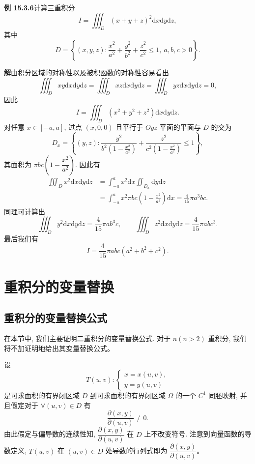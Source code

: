 \documentclass[UTF8,12pt,a4paper,fontset=fandol]{ctexart}
\begin{document}
\noindent\textbf{例 15.3.6}\quad 计算三重积分
\[
  I=\iiint_D (x+y+z)^2\mathrm dx\mathrm dy\mathrm dz,
\]
其中
\[
  D=\left\{(x,y,z):\frac{x^2}{a^2}+\frac{y^2}{b^2}+\frac{z^2}{c^2}\leqslant1,\ a,b,c>0\right\}.
\]

\noindent\textbf{解}\quad 由积分区域的对称性以及被积函数的对称性容易看出
\[
  \iiint_D xy\mathrm dx\mathrm dy\mathrm dz
  =\iiint_D xz\mathrm dx\mathrm dy\mathrm dz
  =\iiint_D yz\mathrm dx\mathrm dy\mathrm dz=0,
\]
因此
\[
  I=\iiint_D (x^2+y^2+z^2)\mathrm dx\mathrm dy\mathrm dz.
\]
对任意 $x\in[-a,a]$, 过点 $(x,0,0)$ 且平行于 $Oyz$ 平面的平面与 $D$ 的交为
\[
  D_x=\left\{(y,z):\frac{y^2}{b^2\left(1-\frac{x^2}{a^2}\right)}
  +\frac{z^2}{c^2\left(1-\frac{x^2}{a^2}\right)}\leqslant1\right\},
\]
其面积为 $\pi bc\left(1-\dfrac{x^2}{a^2}\right)$. 因此有
\[
\begin{aligned}
  \iiint_D x^2\mathrm dx\mathrm dy\mathrm dz
  &=\int_{-a}^a x^2\mathrm dx\iint_{D_x}\mathrm dy\mathrm dz\\
  &=\int_{-a}^a x^2\pi bc\left(1-\frac{x^2}{a^2}\right)\mathrm dx
    =\frac4{15}\pi a^3bc.
\end{aligned}
\]
同理可计算出
\[
  \iiint_D y^2\mathrm dx\mathrm dy\mathrm dz=\frac4{15}\pi ab^3c,\qquad
  \iiint_D z^2\mathrm dx\mathrm dy\mathrm dz=\frac4{15}\pi abc^3.
\]
最后我们有
\[
  I=\frac4{15}\pi abc(a^2+b^2+c^2).
\]

\section{重积分的变量替换}

\subsection{重积分的变量替换公式}

在本节中, 我们主要证明二重积分的变量替换公式. 对于 $n(n>2)$ 重积分, 我们将不加证明地给出其变量替换公式。

设
\[
  T(u,v):
  \begin{cases}
    x=x(u,v),\\
    y=y(u,v)
  \end{cases}
\]
是可求面积的有界闭区域 $D$ 到可求面积的有界闭区域 $\Omega$ 的一个 $C^1$ 同胚映射, 并且假定对于 $\forall(u,v)\in D$ 有
\[
  \frac{\partial(x,y)}{\partial(u,v)}\ne0.
\]
由此假定与偏导数的连续性知, $\dfrac{\partial(x,y)}{\partial(u,v)}$ 在 $D$ 上不改变符号. 注意到向量函数的导数定义, $T(u,v)$ 在 $(u,v)\in D$ 处导数的行列式即为 $\dfrac{\partial(x,y)}{\partial(u,v)}$。
\end{document}
